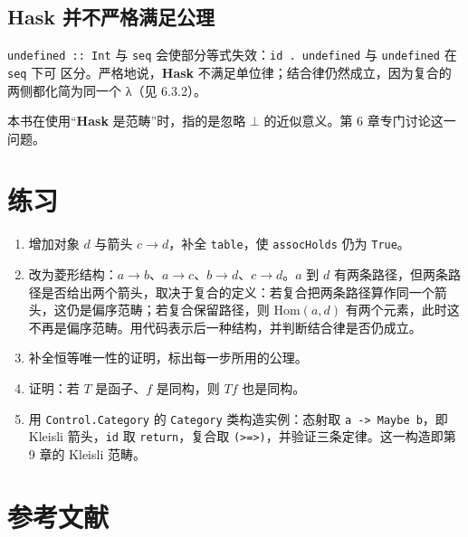 \subsection{\texorpdfstring{\textbf{Hask} 并不严格满足公理}{Hask 并不严格满足公理}}\label{hask-ux5e76ux4e0dux4e25ux683cux6ee1ux8db3ux516cux7406}

\passthrough{\lstinline!undefined :: Int!} 与 \passthrough{\lstinline!seq!} 会使部分等式失效：\passthrough{\lstinline!id . undefined!} 与 \passthrough{\lstinline!undefined!} 在 \passthrough{\lstinline!seq!} 下可
区分。严格地说，\textbf{Hask} 不满足单位律；结合律仍然成立，因为复合的两侧都化简为同一个 λ（见 6.3.2）。

本书在使用“\textbf{Hask} 是范畴”时，指的是忽略 \(\bot\) 的近似意义。第 6 章专门讨论这一问题。

\section{练习}\label{ux7ec3ux4e60}

\begin{enumerate}
\def\labelenumi{\arabic{enumi}.}
\tightlist
\item
  增加对象 \(d\) 与箭头 \(c \to d\)，补全 \passthrough{\lstinline!table!}，使 \passthrough{\lstinline!assocHolds!} 仍为 \passthrough{\lstinline!True!}。
\item
  改为菱形结构：\(a \to b\)、\(a \to c\)、\(b \to d\)、\(c \to d\)。\(a\) 到 \(d\) 有两条路径，但两条路径是否给出两个箭头，取决于复合的定义：若复合把两条路径算作同一个箭头，这仍是偏序范畴；若复合保留路径，则 \(\mathrm{Hom}(a, d)\) 有两个元素，此时这不再是偏序范畴。用代码表示后一种结构，并判断结合律是否仍成立。
\item
  补全恒等唯一性的证明，标出每一步所用的公理。
\item
  证明：若 \(T\) 是函子、\(f\) 是同构，则 \(Tf\) 也是同构。
\item
  用 \passthrough{\lstinline!Control.Category!} 的 \passthrough{\lstinline!Category!} 类构造实例：态射取 \passthrough{\lstinline!a -> Maybe b!}，即 Kleisli 箭头，\passthrough{\lstinline!id!} 取 \passthrough{\lstinline!return!}，复合取 \passthrough{\lstinline!(>=>)!}，并验证三条定律。这一构造即第 9 章的 Kleisli 范畴。
\end{enumerate}

\section*{参考文献}
\label{ux53c2ux8003ux6587ux732e}

